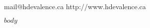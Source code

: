 \documentclass[letterpaper,10pt]{article}
\begin{document}
\thispagestyle{empty}

 \\
mail@hdevalence.ca \quad http:/\kern-1.7pt/www.hdevalence.ca

$body$
\end{document}
